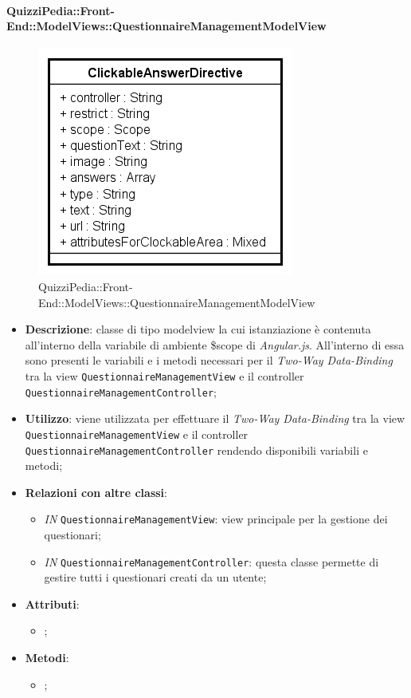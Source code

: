 	\paragraph{QuizziPedia::Front-End::ModelViews::QuestionnaireManagementModelView}
	
	\label{QuizziPedia::Front-End::ModelViews::QuestionnaireManagementModelView}
	
	\begin{figure}[ht]
		\centering
		\includegraphics[scale=0.5,keepaspectratio]{UML/Classi/Front-End/QuizziPedia_Front-end_Templates_ClickableAnswerTemplate.png}
		\caption{QuizziPedia::Front-End::ModelViews::QuestionnaireManagementModelView}
	\end{figure} \FloatBarrier
	
	\begin{itemize}
		\item \textbf{Descrizione}: classe di tipo modelview la cui istanziazione è contenuta all'interno della variabile di ambiente \$scope di \textit{Angular.js}. All'interno di essa sono presenti le variabili e i metodi necessari per il \textit{Two-Way Data-Binding} tra la view \texttt{QuestionnaireManagementView} e il controller \texttt{QuestionnaireManagementController};
		\item \textbf{Utilizzo}: viene utilizzata per effettuare il \textit{Two-Way Data-Binding} tra la view \texttt{QuestionnaireManagementView} e il controller \texttt{QuestionnaireManagementController} rendendo disponibili variabili e metodi;
		\item \textbf{Relazioni con altre classi}: 
		\begin{itemize}
			\item \textit{IN} \texttt{QuestionnaireManagementView}: view principale per la gestione dei questionari; 
			\item \textit{IN} \texttt{QuestionnaireManagementController}: questa classe permette di gestire tutti i questionari creati da un utente;
		\end{itemize}
		\item \textbf{Attributi}: 
		\begin{itemize}
			\item ;
		\end{itemize}
		\item \textbf{Metodi}: 
		\begin{itemize}
			\item ;
		\end{itemize}
	\end{itemize}
	
